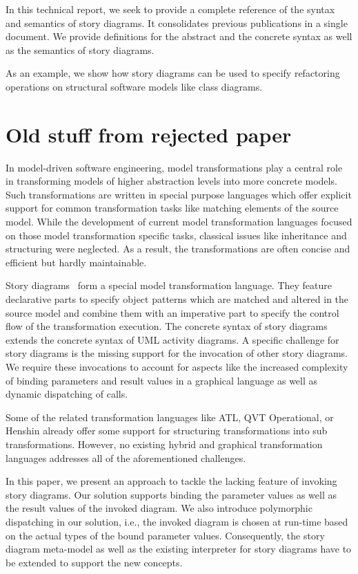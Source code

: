 In this technical report, we seek to provide a complete reference of the syntax and semantics of story diagrams.
It consolidates previous publications in a single document.
We provide definitions for the abstract and the concrete syntax as well as the semantics of story diagrams.

As an example, we show how story diagrams can be used to specify refactoring operations on structural software models like class diagrams.


\section*{Old stuff from rejected paper}
In model-driven software engineering, model transformations play a central role in transforming models of higher abstraction levels into more concrete models. 
Such transformations are written in special purpose languages which offer explicit support for common transformation tasks like matching elements of the source model.
While the development of current model transformation languages focused on those model transformation specific tasks, classical issues like inheritance and structuring were neglected.
As a result, the transformations are often concise and efficient but hardly maintainable.

Story diagrams~\cite{ZSW99,FNTZ00,Zun01} form a special model transformation language.
They feature declarative parts to specify object patterns which are matched and altered in the source model and combine them with an imperative part to specify the control flow of the transformation execution.
The concrete syntax of story diagrams extends the concrete syntax of UML activity diagrams.
A specific challenge for story diagrams is the missing support for the invocation of other story diagrams.
We require these invocations to account for aspects like the increased complexity of binding parameters and result values in a graphical language as well as dynamic dispatching of calls.

Some of the related transformation languages like ATL, QVT Operational, or Henshin already offer some support for structuring transformations into sub transformations.
However, no existing hybrid and graphical transformation languages addresses all of the aforementioned challenges. 

In this paper, we present an approach to tackle the lacking feature of invoking story diagrams.
Our solution supports binding the parameter values as well as the result values of the invoked diagram.
We also introduce polymorphic dispatching in our solution, i.e., the invoked diagram is chosen at run-time based on the actual types of the bound parameter values.
Consequently, the story diagram meta-model as well as the existing interpreter for story diagrams \cite{GHS09} have to be extended to support the new concepts. 

